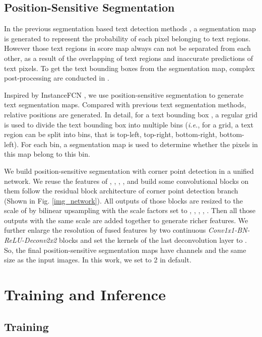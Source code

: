 \documentclass[10pt,twocolumn,letterpaper]{article}
\begin{document}
\subsection{Position-Sensitive Segmentation}

In the previous segmentation based text detection methods \cite{zhang2016multi, yao2016scene}, a segmentation map is generated to represent the probability of each pixel  belonging to text regions. However those text regions in score map always can not be separated from each other,  as a result of the overlapping of text regions and inaccurate predictions of text pixels. To get the text bounding boxes from the segmentation map, complex post-processing are conducted in \cite{zhang2016multi, yao2016scene}. 

Inspired by InstanceFCN \cite{dai2016instance}, we use position-sensitive segmentation to generate text segmentation maps. Compared with previous text segmentation methods, relative positions are generated. In detail, for a text bounding box , a  regular grid is used to divide the text bounding  box into multiple bins (\emph{i.e.}, for a  grid, a text region can be split into  bins, that is top-left, top-right, bottom-right, bottom-left). For each bin, a segmentation map is used to determine whether the pixels in this map belong to this bin.

We build position-sensitive segmentation with corner point detection in a unified network. We reuse the features of {, , , , } and build some convolutional blocks  on them follow the residual block architecture of corner point detection branch (Shown in Fig. \ref{img_network}). All outputs of those blocks are resized to the scale of  by bilinear upsampling with the scale factors set to {, , , , }. Then all those outputs with the same scale are added together to generate richer features. We further enlarge the resolution of fused features by two continuous \emph{Conv1x1-BN-ReLU-Deconv2x2} blocks and set the kernels of the last deconvolution layer to . So, the final position-sensitive segmentation maps have  channels and the same size as the input images. In this work, we set  to 2 in default.

\section{Training and Inference}

\subsection{Training}
\end{document}
